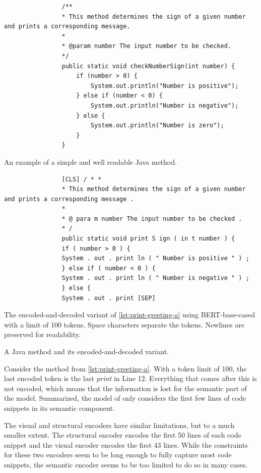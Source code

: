 \documentclass[%
class=scrreprt,
chapterprefix=false,%
open=right,%
twoside=false,%
paper=a4,%
logofile={Logo\_zentral\_farbig\_EN.png},%
thesistype=master,%
UKenglish,%
]{se2thesis}
\theoremstyle{definition}
\begin{document}
	\begin{listing}[p]
		\begin{sublisting}{\linewidth}
			\begin{verbatim}
				/**
				* This method determines the sign of a given number and prints a corresponding message.
				*
				* @param number The input number to be checked.
				*/
				public static void checkNumberSign(int number) {
					if (number > 0) {
						System.out.println("Number is positive");
					} else if (number < 0) {
						System.out.println("Number is negative");
					} else {
						System.out.println("Number is zero");
					}
				}
			\end{verbatim}
			\caption{An example of a simple and well readable Java method.}
			\label{lst:print-greeting-a}
		\end{sublisting}
		
		\begin{sublisting}{\linewidth}
			\begin{verbatim}
				[CLS] / * *
				* This method determines the sign of a given number and prints a corresponding message .
				*
				* @ para m number The input number to be checked .
				* /
				public static void print S ign ( in t number ) {
				if ( number > 0 ) {
				System . out . print ln ( " Number is positive " ) ;
				} else if ( number < 0 ) {
				System . out . print ln ( " Number is negative " ) ;
				} else {
				System . out . print [SEP]
			\end{verbatim}
			\caption{The encoded-and-decoded variant of \autoref{lst:print-greeting-a} using BERT-base-cased with a limit of 100 tokens. Space characters separate the tokens. Newlines are preserved for readability.}
			\label{lst:print-greeting-b}
		\end{sublisting}
		\caption{A Java method and its encoded-and-decoded variant.}
		\label{lst:print-greeting}
	\end{listing}
	
	Consider the method from \autoref{lst:print-greeting-a}. With a token limit of 100, the last encoded token is the last \textit{print} in Line 12. Everything that comes after this is not encoded, which means that the information is lost for the semantic part of the model. Summarized, the model of \citeauthor{mi2022towards} only considers the first few lines of code snippets in its semantic component.
	
	The visual and structural encoders have similar limitations, but to a much smaller extent. The structural encoder encodes the first 50 lines of each code snippet and the visual encoder encodes the first 43 lines. While the constraints for these two encoders seem to be long enough to fully capture most code snippets, the semantic encoder seems to be too limited to do so in many cases.
\end{document}
